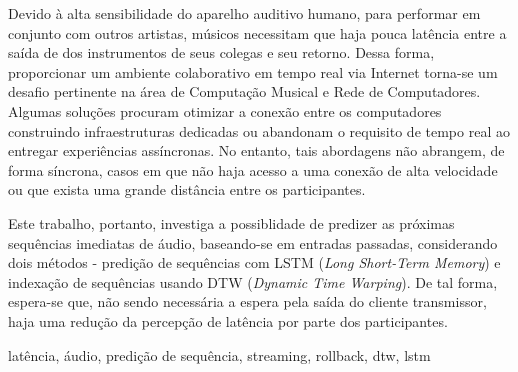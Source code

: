\resumo
{}

Devido à alta sensibilidade do aparelho auditivo humano, para performar em conjunto com outros artistas, músicos necessitam que haja pouca latência entre a saída de dos instrumentos de seus colegas e seu retorno. Dessa forma, proporcionar um ambiente colaborativo em tempo real via Internet torna-se um desafio pertinente na área de Computação Musical e Rede de Computadores. Algumas soluções procuram otimizar a conexão entre os computadores construindo infraestruturas dedicadas ou abandonam o requisito de tempo real ao entregar experiências assíncronas. No entanto, tais abordagens não abrangem, de forma síncrona, casos em que não haja acesso a uma conexão de alta velocidade ou que exista uma grande distância entre os participantes.

Este trabalho, portanto, investiga a possiblidade de predizer as próximas sequências imediatas de áudio, baseando-se em entradas passadas, considerando dois métodos - predição de sequências com LSTM (\textit{Long Short-Term Memory}) e indexação de sequências usando DTW (\textit{Dynamic Time Warping}). De tal forma, espera-se que, não sendo necessária a espera pela saída do cliente transmissor, haja uma redução da percepção de latência por parte dos participantes.

\begin{keywords}
latência, áudio, predição de sequência, streaming, rollback, dtw, lstm
\end{keywords}

